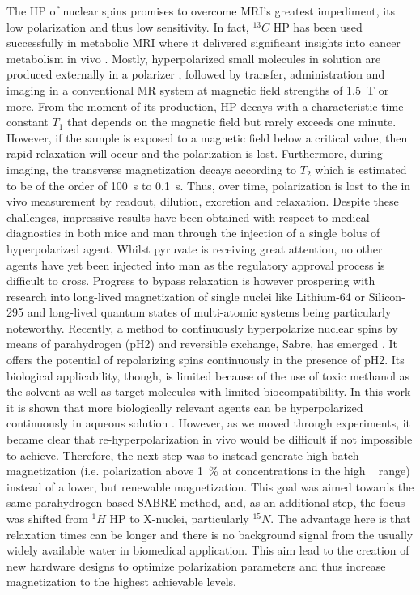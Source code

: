     The HP of nuclear spins promises to overcome MRI's greatest impediment, its low polarization and thus low sensitivity. In fact, $^{13}C$ HP has been used successfully in metabolic MRI where it delivered significant insights into cancer metabolism in vivo \cite{golman_cardiac_2008}. Mostly, hyperpolarized small molecules in solution are produced externally in a polarizer \cite{ardenkjaer-larsen_present_2016}, followed by transfer, administration and imaging in a conventional MR system at magnetic field strengths of \SI{1.5}{\tesla} or more. From the moment of its production, HP decays with a characteristic time constant $T_1$ that depends on the magnetic field but rarely exceeds one minute. However, if the sample is exposed to a magnetic field below a critical value, then rapid relaxation will occur and the polarization is lost. Furthermore, during imaging, the transverse magnetization decays according to $T_2$ which is estimated to be of the order of \SI{100}{\second} to  \SI{0.1}{\second}. Thus, over time, polarization is lost to the in vivo measurement by readout, dilution, excretion and relaxation. Despite these challenges, impressive results have been obtained with respect to medical diagnostics in both mice and man through the injection of a single bolus of hyperpolarized agent. Whilst pyruvate is receiving great attention, no other agents have yet been injected into man as the regulatory approval process is difficult to cross. Progress to bypass relaxation is however prospering with research into long-lived magnetization of single nuclei like Lithium-64\cite{van_heeswijk_hyperpolarized_2009} or Silicon-295 \cite{kwiatkowski_nanometer_2017} and long-lived quantum states of multi-atomic systems\cite{pileio_storage_2010, noauthor_y._nodate} being particularly noteworthy. Recently, a method to continuously hyperpolarize  nuclear spins by means of parahydrogen (pH2) and reversible exchange, Sabre, has emerged \cite{adams_reversible_2009-2, hovener_continuous_2014-1}. It offers the potential of repolarizing spins continuously in the presence of pH2. Its biological applicability, though, is limited because of the use of toxic methanol as the solvent as well as target molecules with limited biocompatibility. In this work it is shown that more biologically relevant agents can be hyperpolarized continuously in aqueous solution \cite{truong_irreversible_2014-1}. However, as we moved through experiments, it became clear that re-hyperpolarization in vivo would be difficult if not impossible to achieve. Therefore, the next step was to instead generate high batch magnetization (i.e. polarization above \SI{1}{\percent} at concentrations in the high \si{\milli\molar} range) instead of a lower, but renewable magnetization. This goal was aimed towards the same parahydrogen based SABRE method, and, as an additional step, the focus was shifted from $^1H$ HP to X-nuclei, particularly $^{15}N$\cite{truong_15n_2015-1}. The advantage here is that relaxation times can be longer and there is no background signal from the usually widely available water in biomedical application. This aim lead to the creation of new hardware designs to optimize polarization parameters and thus increase magnetization to the highest achievable levels.
